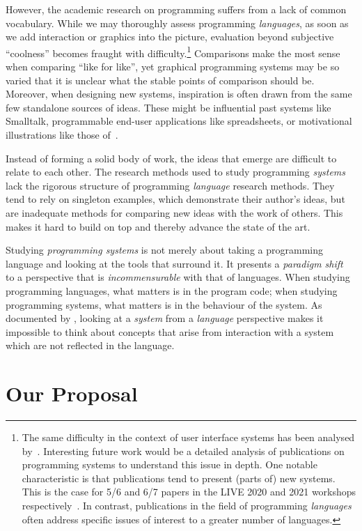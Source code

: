 \documentclass[ twoside,openright,titlepage,numbers=noenddot,headinclude,footinclude,cleardoublepage=empty,abstract=on,
                BCOR=5mm,paper=a4,fontsize=11pt
                ]{scrreprt}
\theoremstyle{definition}
\begin{document}
However, the academic research on programming suffers from a lack of
common vocabulary. While we may thoroughly assess programming
\emph{languages}, as soon as we add interaction or graphics into the
picture, evaluation beyond subjective ``coolness'' becomes fraught with
difficulty.\footnote{The same difficulty in the context of user
  interface systems has been analysed by~\textcite{EvUISR}. Interesting
  future work would be a detailed analysis of publications on
  programming systems to understand this issue in depth. One notable
  characteristic is that publications tend to present (parts of) new
  systems. This is the case for 5/6 and 6/7 papers in the LIVE 2020 and
  2021 workshops respectively~\parencite{LIVE20, LIVE21}. In contrast,
  publications in the field of programming \emph{languages} often
  address specific issues of interest to a greater number of languages.}
Comparisons make the most sense when comparing ``like for like'', yet
graphical programming systems may be so varied that it is unclear what
the stable points of comparison should be. Moreover, when designing new
systems, inspiration is often drawn from the same few standalone sources
of ideas. These might be influential past systems like Smalltalk,
programmable end-user applications like spreadsheets, or motivational
illustrations like those of~\textcite{BretVictor}.

Instead of forming a solid body of work, the ideas that emerge are
difficult to relate to each other. The research methods used to study
programming \emph{systems} lack the rigorous structure of programming
\emph{language} research methods. They tend to rely on singleton
examples, which demonstrate their author's ideas, but are inadequate
methods for comparing new ideas with the work of others. This makes it
hard to build on top and thereby advance the state of the art.

Studying \emph{programming systems} is not merely about taking a
programming language and looking at the tools that surround it. It
presents a \emph{paradigm shift}~\parencite{Kuhn} to a perspective that
is \emph{incommensurable} with that of languages. When studying
programming languages, what matters is in the program code; when
studying programming systems, what matters is in the behaviour of the
system. As documented by \textcite{PLrev}, looking at a \emph{system}
from a \emph{language} perspective makes it impossible to think about
concepts that arise from interaction with a system which are not
reflected in the language.

\hypertarget{our-proposal}{\section{Our Proposal}\label{our-proposal}}
\end{document}
